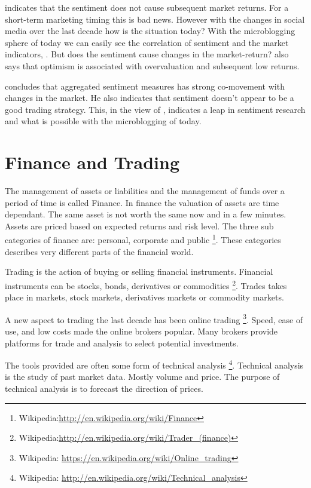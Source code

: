 \cite[p3]{Brown20041} indicates that the sentiment does not cause subsequent
market returns. For a short-term marketing timing this is bad news. However
with the changes in social media over the last decade how is the situation
today? With the microblogging sphere of today we can easily see the
correlation of sentiment and the market indicators,
\cite[]{annikajubbega11:twitter_driver_stock_price}. But
does the sentiment cause changes in the market-return?
\cite[p3]{Brown20041} also says that optimism is associated with overvaluation
and subsequent low returns.

\cite[p]{Brown20041} concludes that aggregated sentiment measures has strong
co-movement with changes in the market. He also indicates that sentiment
doesn't appear to be a good trading strategy. This, in the view of
\cite[]{Zhang201155}, indicates a leap in sentiment research and what is possible
with the microblogging of today.

\section{Finance and Trading}\label{previous_work:finance}

The management of assets or liabilities and the management of funds over a
period of time is called Finance. In finance the valuation of assets are time
dependant. The same asset is not worth the same now and in a few minutes. Assets
are priced based on expected returns and risk level. The three sub categories
of finance are: personal, corporate and public \footnote{Wikipedia:\url{http://en.wikipedia.org/wiki/Finance}}.
These categories describes very different parts of the financial world. 

Trading is the action of buying or selling financial instruments.
Financial instruments can be stocks, bonds, derivatives or commodities 
\footnote{Wikipedia:\url{http://en.wikipedia.org/wiki/Trader_(finance)}}.
Trades takes place in markets, stock markets, derivatives markets or commodity
markets.

A new aspect to trading the last decade has been online trading
\footnote{Wikipedia: \url{https://en.wikipedia.org/wiki/Online_trading}}.
Speed, ease of use, and low costs made the online brokers popular. Many brokers
provide platforms for trade and analysis to select potential investments.  

The tools provided are often some form of technical analysis \footnote{Wikipedia:
\url{http://en.wikipedia.org/wiki/Technical_analysis}}. Technical analysis is
the study of past market data. Mostly volume and price. The purpose of technical
analysis is to forecast the direction of prices.  

